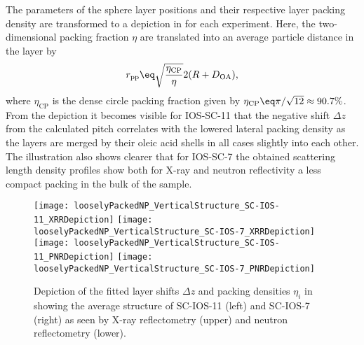 \documentclass[\main/dresen_thesis.tex]{subfiles}
\begin{document}
  The parameters of the sphere layer positions and their respective layer packing density are transformed to a depiction in  for each experiment.
  Here, the two-dimensional packing fraction $\eta$ are translated into an average particle distance in the layer by
  \begin{align}
    r_\mathrm{pp} \eq \sqrt{\frac{\eta_\mathrm{CP}}{\eta}} 2 (R + D_\mathrm{OA}),
  \end{align}
  where $\eta_\mathrm{CP}$ is the dense circle packing fraction given by $\eta_\mathrm{CP} \eq \pi / \sqrt{12} \approx 90.7 \%$.
  From the depiction it becomes visible for IOS-SC-11 that the negative shift $\Delta z$ from the calculated pitch correlates with the lowered lateral packing density as the layers are merged by their oleic acid shells in all cases slightly into each other.
  The illustration also shows clearer that for IOS-SC-7 the obtained scattering length density profiles show both for X-ray and neutron reflectivity a less compact packing in the bulk of the sample.

  \begin{figure}[tb]
    \centering
    \texttt{[image: looselyPackedNP\_VerticalStructure\_SC-IOS-11\_XRRDepiction]}
    \texttt{[image: looselyPackedNP\_VerticalStructure\_SC-IOS-7\_XRRDepiction]}
    \texttt{[image: looselyPackedNP\_VerticalStructure\_SC-IOS-11\_PNRDepiction]}
    \texttt{[image: looselyPackedNP\_VerticalStructure\_SC-IOS-7\_PNRDepiction]}
    \caption{\label{fig:looselyPackedNP:layer:reflectivityDepiction}Depiction of the fitted layer shifts $\Delta z$ and packing densities $\eta_i$ in  showing the average structure of SC-IOS-11 (left) and SC-IOS-7 (right) as seen by X-ray reflectometry (upper) and neutron reflectometry (lower).}
  \end{figure}
\end{document}
